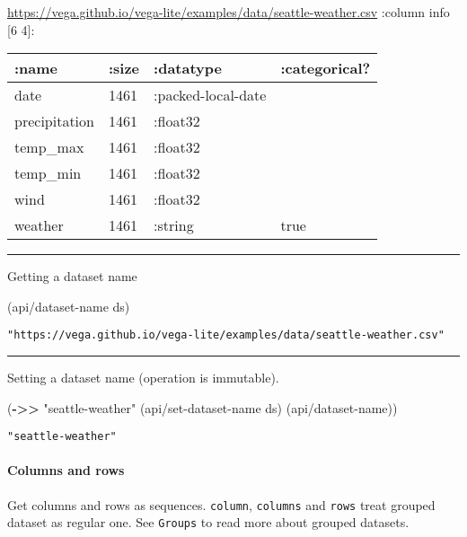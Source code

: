 \documentclass[]{article}
\newenvironment{Shaded}{\begin{snugshade}}{\end{snugshade}}
\newcommand{\KeywordTok}[1]{\textcolor[rgb]{0.13,0.29,0.53}{\textbf{#1}}}
\newcommand{\StringTok}[1]{\textcolor[rgb]{0.31,0.60,0.02}{#1}}
\newcommand{\NormalTok}[1]{#1}
\let\oldparagraph\paragraph
\renewcommand{\paragraph}[1]{\oldparagraph{#1}\mbox{}}
\begin{document}
\url{https://vega.github.io/vega-lite/examples/data/seattle-weather.csv}
:column info {[}6 4{]}:

\begin{longtable}[]{@{}llll@{}}
\toprule
:name & :size & :datatype & :categorical?\tabularnewline
\midrule
\endhead
date & 1461 & :packed-local-date &\tabularnewline
precipitation & 1461 & :float32 &\tabularnewline
temp\_max & 1461 & :float32 &\tabularnewline
temp\_min & 1461 & :float32 &\tabularnewline
wind & 1461 & :float32 &\tabularnewline
weather & 1461 & :string & true\tabularnewline
\bottomrule
\end{longtable}

\begin{center}\rule{0.5\linewidth}{0.5pt}\end{center}

Getting a dataset name

\begin{Shaded}
\begin{Highlighting}[]
\NormalTok{(api/dataset-name ds)}
\end{Highlighting}
\end{Shaded}

\begin{verbatim}
"https://vega.github.io/vega-lite/examples/data/seattle-weather.csv"
\end{verbatim}

\begin{center}\rule{0.5\linewidth}{0.5pt}\end{center}

Setting a dataset name (operation is immutable).

\begin{Shaded}
\begin{Highlighting}[]
\NormalTok{(}\KeywordTok{->>} \StringTok{"seattle-weather"}
\NormalTok{     (api/set-dataset-name ds)}
\NormalTok{     (api/dataset-name))}
\end{Highlighting}
\end{Shaded}

\begin{verbatim}
"seattle-weather"
\end{verbatim}

\paragraph{Columns and rows}\label{columns-and-rows}

Get columns and rows as sequences. \texttt{column}, \texttt{columns} and
\texttt{rows} treat grouped dataset as regular one. See \texttt{Groups}
to read more about grouped datasets.
\end{document}
